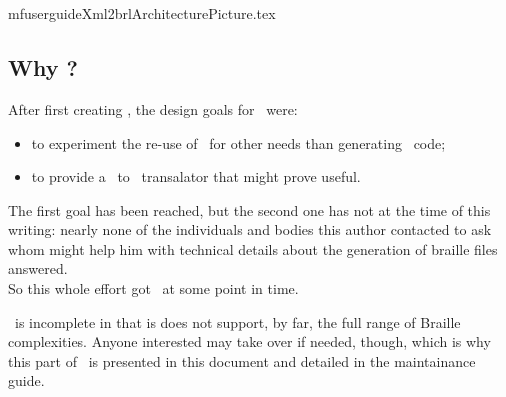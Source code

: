 



\chapter{\xmlToBrl\ }

{mfuserguideXml2brlArchitecturePicture.tex}


\section{Why \xmlToBrl?}

After first creating \xmlToLy, the design goals for \xmlToBrl\ were:
\begin{itemize}
\item to experiment the re-use of \msrRepr\ for other needs than generating \lily\ code;
\item to provide a \mxml\ to \braille\ transalator that might prove useful.
\end{itemize}

The first goal has been reached, but the second one has not at the time of this writing: nearly none of the individuals and bodies this author contacted to ask whom might help him with technical details about the generation of braille files answered.\\
So this whole effort got \frozen\ at some point in time.

\xmlToBrl\ is incomplete in that is does not support, by far, the full range of Braille complexities. Anyone interested may take over if needed, though, which is why this part of \mf\ is presented in this document and detailed in the maintainance guide.


